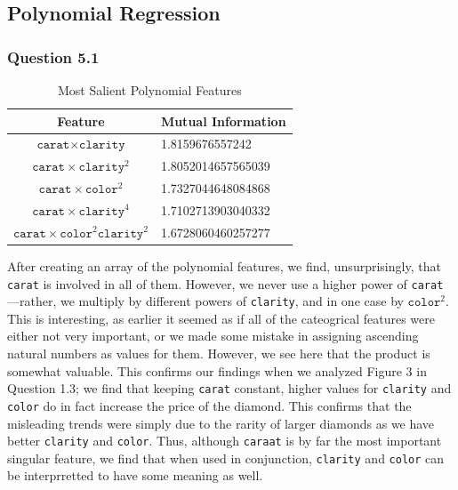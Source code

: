 \documentclass[11pt,letterpaper]{article}
\begin{document}
\subsection*{Polynomial Regression}

\subsubsection*{Question 5.1}

\begin{table}[ht]
\centering
    \label{table1} 
    \begin{tabular}{cl} 
    \hline
    \multicolumn{1}{c}{Feature} & \multicolumn{1}{c}{Mutual Information}\\
    \hline 
        $\texttt{carat} \times \texttt{clarity}$ & 1.8159676557242 \\
        $\texttt{carat} \times \texttt{clarity}^2$& 1.8052014657565039 \\
        $\texttt{carat} \times \texttt{color}^2$ & 1.7327044648084868 \\
        $\texttt{carat} \times \texttt{clarity}^4$ & 1.7102713903040332 \\
        $\texttt{carat} \times \texttt{color}^2 \texttt{clarity}^2$ & 1.6728060460257277 
    \end{tabular}
    \caption{Most Salient Polynomial Features}
    \end{table}
After creating an array of the polynomial features, we find, unsurprisingly, that \texttt{carat} is involved in all 
of them. However, we never use a higher power of \texttt{carat}—rather, we multiply by different powers of 
\texttt{clarity}, and in one case by $\texttt{color}^2$. This is interesting, as earlier it seemed as if all of the 
cateogrical features were either not very important, or we made some mistake in assigning ascending natural numbers 
as values for them. However, we see here that the product is somewhat valuable. This confirms our findings 
when we analyzed Figure 3 in Question 1.3; we find that keeping \texttt{carat} constant, 
higher values for \texttt{clarity} and \texttt{color} do in fact increase the price of the diamond. This confirms 
that the misleading trends were simply due to the rarity of larger diamonds as we have better \texttt{clarity} and 
\texttt{color}. Thus, although \texttt{caraat} is by far the most important singular feature, we find that when used 
in conjunction, \texttt{clarity} and \texttt{color} can be interprretted to have some meaning as well. 
\end{document}
